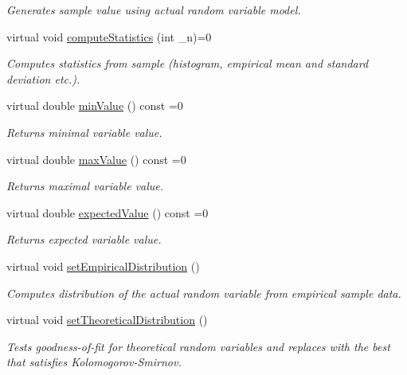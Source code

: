 \begin{DoxyCompactItemize}
\begin{DoxyCompactList}\small\item\em Generates sample value using actual random variable model. \end{DoxyCompactList}\item 
virtual void \hyperlink{class_go_s_u_m_1_1_c_model_variable_afa96767d105fb9f3eb05380480b1febf}{compute\-Statistics} (int \-\_\-n)=0
\begin{DoxyCompactList}\small\item\em Computes statistics from sample (histogram, empirical mean and standard deviation etc.). \end{DoxyCompactList}\item 
virtual double \hyperlink{class_go_s_u_m_1_1_c_model_variable_a3a147e484e87534b549b44c210e8f4ec}{min\-Value} () const =0
\begin{DoxyCompactList}\small\item\em Returns minimal variable value. \end{DoxyCompactList}\item 
virtual double \hyperlink{class_go_s_u_m_1_1_c_model_variable_abf8b08388b38cffce2f8c881b257467a}{max\-Value} () const =0
\begin{DoxyCompactList}\small\item\em Returns maximal variable value. \end{DoxyCompactList}\item 
virtual double \hyperlink{class_go_s_u_m_1_1_c_model_variable_a88f89892435e7e3c2fc86a6b837415bc}{expected\-Value} () const =0
\begin{DoxyCompactList}\small\item\em Returns expected variable value. \end{DoxyCompactList}\item 
virtual void \hyperlink{class_go_s_u_m_1_1_c_model_variable_ad57110dd29c67f648825661e8ba0a3d5}{set\-Empirical\-Distribution} ()
\begin{DoxyCompactList}\small\item\em Computes distribution of the actual random variable from empirical sample data. \end{DoxyCompactList}\item 
virtual void \hyperlink{class_go_s_u_m_1_1_c_model_variable_a762505d1b3d1e36daeebfec111d221b1}{set\-Theoretical\-Distribution} ()
\begin{DoxyCompactList}\small\item\em Tests goodness-\/of-\/fit for theoretical random variables and replaces with the best that satisfies Kolomogorov-\/\-Smirnov. \end{DoxyCompactList}\item 

\end{DoxyCompactItemize}
